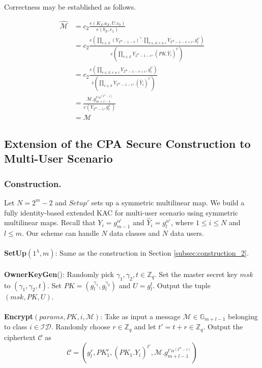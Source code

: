 Correctness may be established as follows.

\begin{equation}
\begin{split}
 \hat{\mathcal{M}}&=c_2\frac{{e}(K_{\mathcal{S}}.a_{\mathcal{S}},U.c_0)}{{e}(b_{\mathcal{S}},c_1)}\\
 &=c_2\frac{e(\prod_{v\in\mathcal{S}}\left({Y_{2^m-1-v}}\right)^{\gamma}.\prod_{v\in\mathcal{S},v\neq i}Y_{2^m-1-v+i},g^{t'}_{l})}{e(\prod_{v\in\mathcal{S}}Y_{2^m-1-v},(PK.\hat{Y}_i)^{t'})}\\
 &=c_2\frac{e(\prod_{v\in\mathcal{S},v\neq i}Y_{2^m-1-v+i},g^{t'}_{l})}{e(\prod_{v\in\mathcal{S}}Y_{2^m-1-v},(\hat{Y}_i)^{t'})}\\
 &=\frac{\mathcal{M}.g^{t'\alpha^{(2^m-1)}}_{m+l-1}}{e(Y_{2^m-1},g^{t'}_{l})}\\
 &=\mathcal{M}\nonumber
\end{split} 
\end{equation}

\subsection{Extension of the CPA Secure Construction to Multi-User Scenario}
\label{subsec:multiuserKAC_2}
% 
\subsubsection{Construction.} Let $N=2^m-2$ and $Setup'$ sets up a symmetric multilinear map. We build a fully identity-based extended KAC for multi-user scenario using symmetric multilinear maps. Recall that $Y_i=g^{\alpha^i}_{m-1}$ and $\hat{Y}_i=g^{\alpha^i}_l$, where $1\leq i \leq N$ and $l\leq m$. Our scheme can handle $N$ data classes and $N$ data users.\\\\
% 
\noindent\textbf{SetUp}$(1^{\lambda},m)$: Same as the construction in Section \ref{subsec:construction_2}.\\\\
% 
\noindent\textbf{OwnerKeyGen}(): Randomly pick $\gamma_1, \gamma_2, t \in \mathbb{Z}_q$. Set the master secret key $msk$ to $(\gamma_1,\gamma_2,t)$. Set $PK=(g^{\gamma_1}_{l},g^{\gamma_2}_{l})$ and $U=g^{t}_{l}$. Output the tuple $(msk,PK,U)$.\\\\
% 
\noindent\textbf{Encrypt}$(params,PK,i,\mathcal{M})$: Take as input a message $\mathcal{M} \in \mathbb{G}_{m+l-1}$ belonging to class $i \in \mathcal{ID}$. Randomly choose $r\in\mathbb{Z}_q$ and let $t'=t+r \in\mathbb{Z}_q$. Output the ciphertext $\mathcal{C}$ as 
\begin{equation}
 \mathcal{C}=\left(g^r_{l},PK^r_1,(PK_1.\hat{Y}_i)^{t'},\mathcal{M}.g^{t'\alpha^{(2^m-1)}}_{m+l-1}\right)\nonumber
\end{equation}

